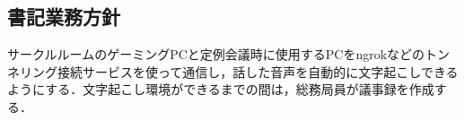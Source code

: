 \subsection*{書記業務方針}

サークルルームのゲーミングPCと定例会議時に使用するPCをngrokなどのトンネリング接続サービスを使って通信し，話した音声を自動的に文字起こしできるようにする．文字起こし環境ができるまでの間は，総務局員が議事録を作成する．
